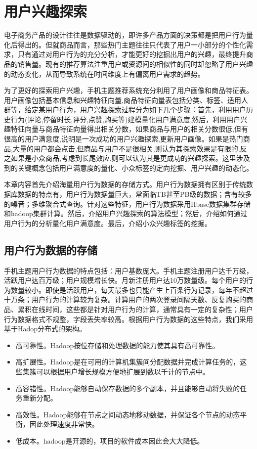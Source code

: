 
\chapter{用户兴趣探索}
\label{chap:interestExplore}
电子商务产品的设计往往是数据驱动的，即许多产品方面的决策都是把用户行为量化后得出的。但就商品而言，那些热门主题往往只代表了用户一小部分的个性化需求，只有通过对用户行为的充分分析，才能更好的挖掘出用户的兴趣，最终提升商品的销售量。现有的推荐算法注重用户或资源间的相似性的同时却忽略了用户兴趣的动态变化，从而导致系统在时间维度上有偏离用户需求的趋势。

为了更好的探索用户兴趣，手机主题推荐系统充分利用了用户画像和商品特征表。用户画像包括基本信息和兴趣特征向量,商品特征向量表包括分类、标签、适用人群等，给定某用户行为，用户兴趣探索过程分为如下几个步骤：首先，利用用户历史行为(评论,停留时长,评分,点赞,购买等)建模量化用户满意度,然后，利用用户兴趣特征向量与商品特征向量得出相关分数，如果商品与用户的相关分数很低,但有很高的用户满意度,说明是一次成功的用户兴趣探索,更新用户画像。如果是热门商品,大量的用户都会点击,但商品与用户不是很相关,则认为其探索效果是有限的,反之如果是小众商品,考虑到长尾效应,则可以认为其是更成功的兴趣探索。这里涉及到的关键概念包括用户满意度的量化、小众标签的定向挖掘、用户兴趣的动态化。

本章内容首先介绍海量用户行为数据的存储方式。用户行为数据拥有区别于传统数据库数据的特点有，用户行为数据量巨大，常面临TB甚至PB级的数据；含有较多的噪音；多维聚合式查询。针对这些特征，用户行为数据采用Hbase数据集群存储和hadoop集群计算。然后，介绍用户兴趣探索的算法模型；然后，介绍如何通过用户行为的分析量化用户满意度。最后，介绍小众兴趣标签的挖掘。

\section{用户行为数据的存储}
手机主题用户行为数据的特点包括：用户基数庞大。手机主题注册用户达千万级，活跃用户达百万级；用户规模增长快。月新注册用户达10万数量级。每个用户的行为数量较小。即使是活跃用户，每天最多也只能产生上百条行为记录，每年不超过十万条；用户行为的计算较为复杂。计算用户的两次登录间隔天数、反复购买的商品、累积在线时间，这些都是针对用户行为的计算，通常具有一定的复杂性；用户行为数据格式不规整，字段丢失率较高。根据用户行为数据的这些特点，我们采用基于Hadop分布式的架构。
\begin{itemize}
\item 高可靠性。Hadoop按位存储和处理数据的能力使其具有高可靠性。
\item 高扩展性。Hadoop是在可用的计算机集簇间分配数据并完成计算任务的，这些集簇可以根据用户增长规模方便地扩展到数以千计的节点中。
\item 高容错性。Hadoop能够自动保存数据的多个副本，并且能够自动将失败的任务重新分配。
\item 高效性。Hadoop能够在节点之间动态地移动数据，并保证各个节点的动态平衡，因此处理速度非常快。
\item 低成本。hadoop是开源的，项目的软件成本因此会大大降低。
\end{itemize}

